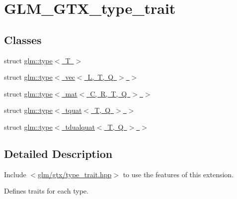 \hypertarget{group__gtx__type__trait}{}\section{G\+L\+M\+\_\+\+G\+T\+X\+\_\+type\+\_\+trait}
\label{group__gtx__type__trait}
\subsection*{Classes}
\begin{DoxyCompactItemize}
\item 
struct \mbox{\hyperlink{structglm_1_1type}{glm\+::type$<$ T $>$}}
\item 
struct \mbox{\hyperlink{structglm_1_1type_3_01vec_3_01_l_00_01_t_00_01_q_01_4_01_4}{glm\+::type$<$ vec$<$ L, T, Q $>$ $>$}}
\item 
struct \mbox{\hyperlink{structglm_1_1type_3_01mat_3_01_c_00_01_r_00_01_t_00_01_q_01_4_01_4}{glm\+::type$<$ mat$<$ C, R, T, Q $>$ $>$}}
\item 
struct \mbox{\hyperlink{structglm_1_1type_3_01tquat_3_01_t_00_01_q_01_4_01_4}{glm\+::type$<$ tquat$<$ T, Q $>$ $>$}}
\item 
struct \mbox{\hyperlink{structglm_1_1type_3_01tdualquat_3_01_t_00_01_q_01_4_01_4}{glm\+::type$<$ tdualquat$<$ T, Q $>$ $>$}}
\end{DoxyCompactItemize}


\subsection{Detailed Description}
Include $<$\mbox{\hyperlink{type__trait_8hpp}{glm/gtx/type\+\_\+trait.\+hpp}}$>$ to use the features of this extension.

Defines traits for each type. 